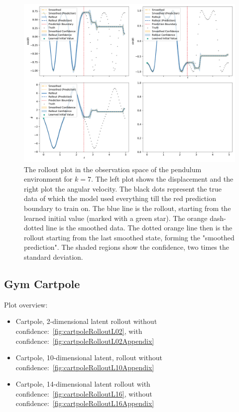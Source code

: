		\begin{figure}
			\centering
			\includegraphics[width=\linewidth]{figures/results/pendulum-gym/run-latent-dim-07/rollout-observations-N0.pdf}
			\caption[Rollout of the Gym pendulum experiment for 7 latent dimensions]{The rollout plot in the observation space of the pendulum environment for \(k = 7\). The left plot shows the displacement and the right plot the angular velocity. The black dots represent the true data of which the model used everything till the red prediction boundary to train on. The blue line is the rollout, starting from the learned initial value (marked with a green star). The orange dash-dotted line is the smoothed data. The dotted orange line then is the rollout starting from the last smoothed state, forming the "smoothed prediction". The shaded regions show the confidence, \ie two times the standard deviation.}
			\label{fig:gymPendulumRolloutL7}
		\end{figure}

	\subsection{Gym Cartpole}
		Plot overview:
		\begin{itemize}
			\item Cartpole, 2-dimensional latent rollout without confidence:~\autoref{fig:cartpoleRolloutL02}, with confidence:~\autoref{fig:cartpoleRolloutL02Appendix}
			\item Cartpole, 10-dimensional latent, rollout without confidence:~\autoref{fig:cartpoleRolloutL10Appendix}
			\item Cartpole, 14-dimensional latent rollout with confidence:~\autoref{fig:cartpoleRolloutL16}, without confidence:~\autoref{fig:cartpoleRolloutL16Appendix}
		\end{itemize}

